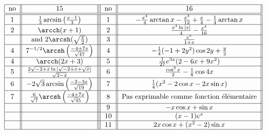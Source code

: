 \[ \begin{tabular}{| c || c || | c | | c | | }
\hline       no &         ${ 15}                                          $                                   &  no    &  ${ 16}  $                                                                                              \\    \hline \hline
             $1$   &      $      \frac{1}{3}\arcsin \left(\frac{x-1}{3}\right)                  $          & $1$  &  $ -\frac{x^4}{4} \arctan x - \frac{x^3}{12}+\frac{x}{4}-\frac{1}{4}\arctan x$    \\ \hline 
            $2$   &      $      \arcch(x+1)              $                                                     & $2$  &  $\frac{x^4\ln| x|}{4}-\frac{x^4}{16} $          						\\ \hline
                      &   and           $   2\arcsh(\sqrt{\frac{x}{2}}) $         			        & $3$  &  $\frac{e^x}{1+x}$       									\\ \hline 
           $4$   &        $  7^{-1/2}\arcsh\left( \frac{-4+7x}{\sqrt 47} \right)               $                               &  $4$ &  $-\frac{1}{4}(-1+2y^2)\cos 2y + \frac{y}{2}$    					\\ \hline 
         $4$   &      $ \arcch(2x+3)     $       							&  $5$ &  $\frac{1}{27}e^{3x}(2-6x+9x^2)$       				 \\ \hline
           $5$&       $\frac{2\sqrt{-2+x} \ln |\sqrt{-2 + x} +\sqrt{x}| }{\sqrt{2-x}}   $               & $6$  &  $\frac{\cos^2 x}{2}-\frac{1}{8}\cos 4x $        \\ \hline
            $6$   &      $-2\sqrt{3}\arcsin\left(\frac{-2-3x}{\sqrt{19}}\right)$                & $7$  &  $\frac{1}{4}(x^2-2\cos x -2x\sin x) $                \\ \hline
                $7$      &       			     $\frac{6}{\sqrt{7}}\arcsh\left(\frac{-4+7x}{\sqrt 45}\right)$                                                                      & $8$  &  Pas exprimable comme fonction élémentaire             \\ \hline
                   &       			                                                                         & $9$  &   $-x\cos x +\sin x$           \\ \hline
                    &       			                                                                         & $10$ &  $(x-1)e^x$            \\ \hline
                    &       			                                                                         & $11$ &  $2x\cos x + (x^2-2)\sin x$            \\ \hline
  \end{tabular} \]

